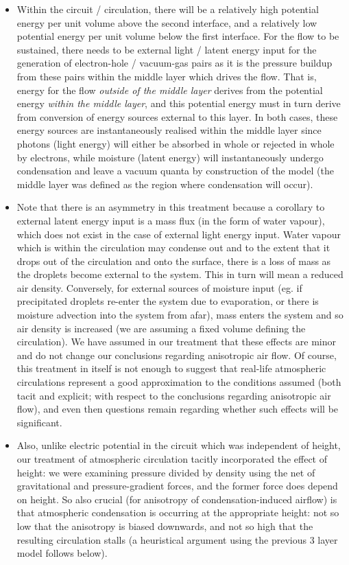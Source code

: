 \begin{itemize}
	\item Within the circuit / circulation, there will be a relatively high potential energy per unit volume above the second interface, and a relatively low potential energy per unit volume below the first interface. For the flow to be sustained, there needs to be external light / latent energy input for the generation of electron-hole / vacuum-gas pairs as it is the pressure buildup from these pairs within the middle layer which drives the flow. That is, energy for the flow \textit{outside of the middle layer} derives from the potential energy \textit{within the middle layer}, and this potential energy must in turn derive from conversion of energy sources external to this layer. In both cases, these energy sources are instantaneously realised within the middle layer since photons (light energy) will either be absorbed in whole or rejected in whole by electrons, while moisture (latent energy) will instantaneously undergo condensation and leave a vacuum quanta by construction of the model (the middle layer was defined as the region where condensation will occur). 
	\item Note that there is an asymmetry in this treatment because a corollary to external latent energy input is a mass flux (in the form of water vapour), which does not exist in the case of external light energy input. Water vapour which is within the circulation may condense out and to the extent that it drops out of the circulation and onto the surface, there is a loss of mass as the droplets become external to the system. This in turn will mean a reduced air density. Conversely, for external sources of moisture input (eg. if precipitated droplets re-enter the system due to evaporation, or there is moisture advection into the system from afar), mass enters the system and so air density is increased (we are assuming a fixed volume defining the circulation). We have assumed in our treatment that these effects are minor and do not change our conclusions regarding anisotropic air flow. Of course, this treatment in itself is not enough to suggest that real-life atmospheric circulations represent a good approximation to the conditions assumed (both tacit and explicit; with respect to the conclusions regarding anisotropic air flow), and even then questions remain regarding whether such effects will be significant.
	\item Also, unlike electric potential in the circuit which was independent of height, our treatment of atmospheric circulation tacitly incorporated the effect of height: we were examining pressure divided by density using the net of gravitational and pressure-gradient forces, and the former force does depend on height. So also crucial (for anisotropy of condensation-induced airflow) is that atmospheric condensation is occurring at the appropriate height: not so low that the anisotropy is biased downwards, and not so high that the resulting circulation stalls (a heuristical argument using the previous 3 layer model follows below).

\end{itemize}
